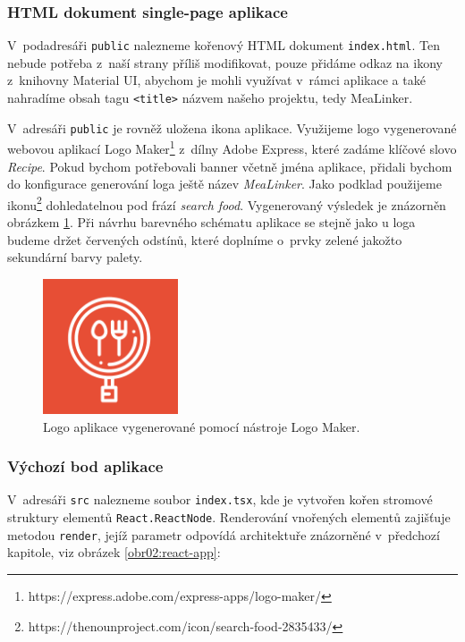 \subsubsection{HTML dokument single-page aplikace}

V~podadresáři \texttt{public} nalezneme kořenový HTML dokument \texttt{index.html}. Ten nebude potřeba z~naší strany příliš modifikovat, pouze přidáme odkaz na ikony z~knihovny Material UI, abychom je mohli využívat v~rámci aplikace a také nahradíme obsah tagu \texttt{<title>} názvem našeho projektu, tedy MeaLinker.

V~adresáři \texttt{public} je rovněž uložena ikona aplikace. Využijeme logo vygenerované webovou aplikací Logo Maker\footnote{https://express.adobe.com/express-apps/logo-maker/} z~dílny Adobe Express, které zadáme klíčové slovo \emph{Recipe}. Pokud bychom potřebovali banner včetně jména aplikace, přidali bychom do konfigurace generování loga ještě název \emph{MeaLinker}. Jako podklad použijeme ikonu\footnote{https://thenounproject.com/icon/search-food-2835433/} dohledatelnou pod frází \emph{search food}. Vygenerovaný výsledek je znázorněn obrázkem \ref{obr03:mealinker-logo}. Při návrhu barevného schématu aplikace se stejně jako u loga budeme držet červených odstínů, které doplníme o~prvky zelené jakožto sekundární barvy palety.

\begin{figure}[h!]\centering
\includegraphics[width=40mm]{../img/mealinker-logo}
\caption{Logo aplikace vygenerované pomocí nástroje Logo Maker.}
\label{obr03:mealinker-logo}
\end{figure}

\subsubsection{Výchozí bod aplikace}

V~adresáři \texttt{src} nalezneme soubor \texttt{index.tsx}, kde je vytvořen kořen stromové struktury elementů \texttt{React.ReactNode}. Renderování vnořených elementů zajišťuje metodou \texttt{render}, jejíž parametr odpovídá architektuře znázorněné v~předchozí kapitole, viz obrázek \ref{obr02:react-app}:

